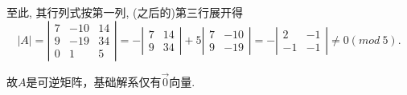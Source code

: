至此, 其行列式按第一列, (之后的)第三行展开得
\begin{displaymath}
|A|=\left|\begin{array}{ccc}7&-10&14\\9&-19&34\\0&1&5\end{array}\right|=
-\left|\begin{array}{cc}7&14\\9&34\end{array}\right|+5\left|\begin{array}{cc}7&-10\\9&-19\end{array}\right|=-
\left|\begin{array}{cc}2&-1\\-1&-1\end{array}\right|\not=0(mod\ 5).\end{displaymath}

故$A$是可逆矩阵，基础解系仅有$\vec{0}$向量.


